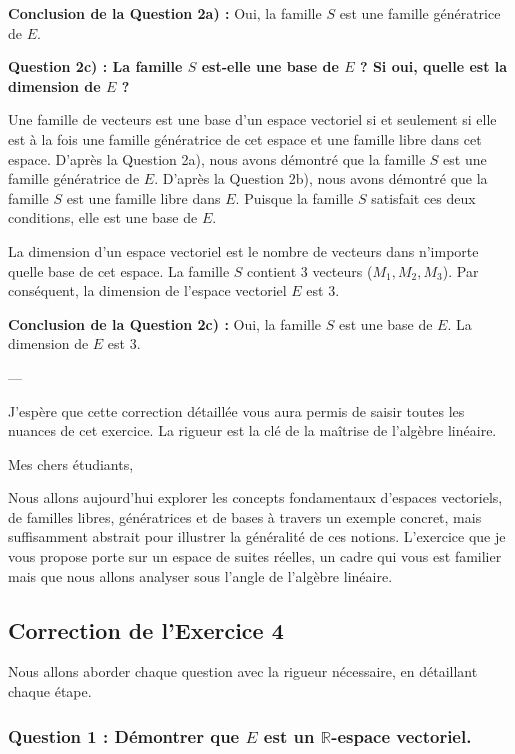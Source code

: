 \documentclass{report}
\begin{document}
\textbf{Conclusion de la Question 2a) :}
Oui, la famille $S$ est une famille génératrice de $E$.



\textbf{Question 2c) : La famille $S$ est-elle une base de $E$ ? Si oui, quelle est la dimension de $E$ ?}

Une famille de vecteurs est une base d'un espace vectoriel si et seulement si elle est à la fois une famille génératrice de cet espace et une famille libre dans cet espace.
D'après la Question 2a), nous avons démontré que la famille $S$ est une famille génératrice de $E$.
D'après la Question 2b), nous avons démontré que la famille $S$ est une famille libre dans $E$.
Puisque la famille $S$ satisfait ces deux conditions, elle est une base de $E$.

La dimension d'un espace vectoriel est le nombre de vecteurs dans n'importe quelle base de cet espace.
La famille $S$ contient 3 vecteurs ($M_1, M_2, M_3$).
Par conséquent, la dimension de l'espace vectoriel $E$ est 3.

\textbf{Conclusion de la Question 2c) :}
Oui, la famille $S$ est une base de $E$. La dimension de $E$ est 3.

---

J'espère que cette correction détaillée vous aura permis de saisir toutes les nuances de cet exercice. La rigueur est la clé de la maîtrise de l'algèbre linéaire.

\newpage


Mes chers étudiants,

Nous allons aujourd'hui explorer les concepts fondamentaux d'espaces vectoriels, de familles libres, génératrices et de bases à travers un exemple concret, mais suffisamment abstrait pour illustrer la généralité de ces notions. L'exercice que je vous propose porte sur un espace de suites réelles, un cadre qui vous est familier mais que nous allons analyser sous l'angle de l'algèbre linéaire.



\subsection*{Correction de l'Exercice 4}

Nous allons aborder chaque question avec la rigueur nécessaire, en détaillant chaque étape.

\subsubsection*{Question 1 : Démontrer que $E$ est un $\mathbb{R}$-espace vectoriel.}
\end{document}
